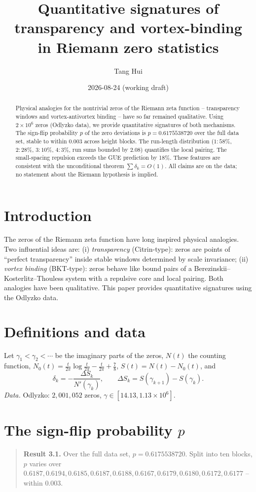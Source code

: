 \documentclass[11pt]{article}
\title{Quantitative signatures of transparency and vortex-binding\\ in Riemann zero statistics}
\author{Tang Hui}
\date{2026-08-24 (working draft)}
\begin{document}
\maketitle

\begin{abstract}
Physical analogies for the nontrivial zeros of the Riemann zeta function --
transparency windows and vortex-antivortex binding -- have so far remained
qualitative. Using $2\times10^6$ zeros (Odlyzko data), we provide quantitative
signatures of both mechanisms. The sign-flip probability $p$ of the zero
deviations is $p=0.6175538720$ over the full data set, stable to within
$0.003$ across height blocks. The run-length distribution
($1{:}58\%$, $2{:}28\%$, $3{:}10\%$, $4{:}3\%$, run sums bounded by $2.08$)
quantifies the local pairing. The small-spacing repulsion exceeds the GUE
prediction by 18\%. These features are consistent with the unconditional
theorem $\sum\delta_k=O(1)$. All claims are on the data; no statement about
the Riemann hypothesis is implied.
\end{abstract}

\section{Introduction}
The zeros of the Riemann zeta function have long inspired physical analogies.
Two influential ideas are: (i) \emph{transparency} (Citrin-type): zeros are
points of ``perfect transparency'' inside stable windows determined by scale
invariance; (ii) \emph{vortex binding} (BKT-type): zeros behave like bound
pairs of a Berezinskii--Kosterlitz--Thouless system with a repulsive core and
local pairing. Both analogies have been qualitative. This paper provides
quantitative signatures using the Odlyzko data.

\section{Definitions and data}
Let $\gamma_1<\gamma_2<\cdots$ be the imaginary parts of the zeros,
$N(t)$ the counting function, $N_0(t)=\frac{t}{2\pi}\log\frac{t}{2\pi}-\frac{t}{2\pi}+\frac78$,
$S(t)=N(t)-N_0(t)$, and
\[
\delta_k=-\frac{\Delta S_k}{N'(\gamma_k)},\qquad
\Delta S_k=S(\gamma_{k+1})-S(\gamma_k).
\]
\emph{Data.} Odlyzko: $2{,}001{,}052$ zeros, $\gamma\in[14.13,1.13\times10^6]$.

\section{The sign-flip probability $p$}
\begin{quote}
\textbf{Result 3.1.} Over the full data set, $p=0.6175538720$. Split into ten
blocks, $p$ varies over $0.6187,0.6194,0.6185,0.6187,0.6188,0.6167,0.6179,
0.6180,0.6172,0.6177$ -- within $0.003$.
\end{quote}
\end{document}
